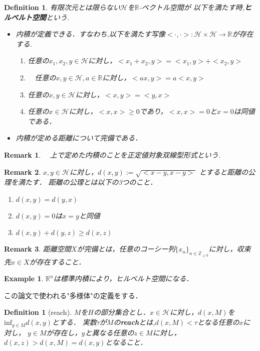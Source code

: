 \documentclass{ujarticle}
\newtheorem{dfn}[thm]{Definition}
\newtheorem{epl}[thm]{Example}
\newtheorem*{rem}{Remark}
\begin{document}
\begin{dfn}
  有限次元とは限らない$\mathcal{H}$を$\mathbb{R}$-ベクトル空間が
  以下を満たす時,\textbf{ヒルベルト空間}という.
  \begin{itemize}
    \item 内積が定義できる．すなわち,以下を満たす写像$< \cdot , \cdot >: \mathcal{H} \times \mathcal{H} \to \mathbb{R}$が存在する.
      \begin{enumerate}
        \item 任意の$x_1,x_2,y \in \mathcal{H}$に対し，${<}x_1 +x_2,y{>}= {<}x_1,y{>} +{<}x_2,y{>}$
        \item　任意の$x,y \in \mathcal{H},a \in \mathbb{R}$に対し，$<ax,y> =a<x,y>$
        \item 任意の$x,y \in \mathcal{H}$に対し，$<x,y>=<y,x>$
        \item 任意の$x \in \mathcal{H}$に対し，${<}x,x{>} \ge 0$であり，${<}x,x{>}=0$と$x=0$は同値である．
      \end{enumerate}
    \item 内積が定める距離について完備である．
  \end{itemize}
\end{dfn}
\begin{rem}
　上で定めた内積のことを正定値対象双線型形式という.
\end{rem}
\begin{rem}
  $x,y \in \mathcal{H}$に対し，$d(x,y):=\sqrt{{<}x-y,x-y{>}}$
 とすると距離の公理を満たす．
 距離の公理とは以下の3つのこと．
 \begin{enumerate}
   \item $d(x,y)=d(y,x)$
   \item $d(x,y)=0$は$x=y$と同値
   \item $d(x,y)+d(y,z) \ge d(x,z)$
 \end{enumerate}
\end{rem}
\begin{rem}
 距離空間$X$が完備とは，任意のコーシー列$\{x_n\}_{n \in \mathbb{Z}_{\ge 0}}$に対し，収束先$x \in X$が存在すること．
\end{rem}
\begin{epl}
 $\mathbb{R}^n$は標準内積により，ヒルベルト空間になる．
\end{epl}

この論文で使われる"多様体"の定義をする．
\begin{dfn}[reach]
  $M$を$H$の部分集合とし．$x\in \mathcal{H}$に対し，$d(x,M)$を$\mathrm{inf}_{y \in M}d(x,y)$とする．
  実数$\tau$が$M$の\textbf{reach}とは,$d(x,M)< \tau$となる任意の$x$に対し，
  $y\in M$が存在し，$y$と異なる任意の$z\in M$に対し，$d(x,z) > d(x,M)=d(x,y)$となること．
\end{dfn}
\end{document}
